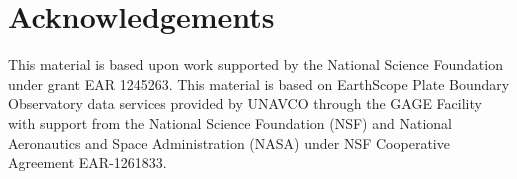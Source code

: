 \documentclass[extra,mreferee]{gji}
\begin{document}
\section{Acknowledgements}
This material is based upon work supported by the National Science Foundation under grant EAR 1245263. This material is based on EarthScope Plate Boundary Observatory data services provided by UNAVCO through the GAGE Facility with support from the National Science Foundation (NSF) and National Aeronautics and Space Administration (NASA) under NSF Cooperative Agreement EAR-1261833. 


  
\end{document}
